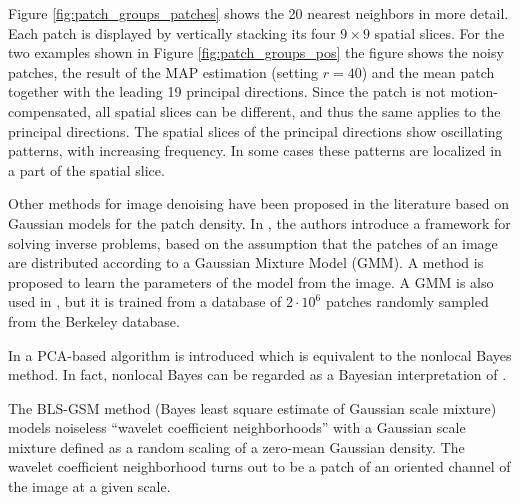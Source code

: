 \documentclass[10pt, journal, twocolumn, final, a4paper]{IEEEtran}
\begin{document}
Figure \ref{fig:patch_groups_patches} shows the 20 nearest neighbors in 
more detail. Each patch is displayed by vertically stacking its four $9\times
9$ spatial slices. For the two examples shown in Figure \ref{fig:patch_groups_pos}
the figure shows the noisy patches, the result of the MAP estimation (setting
$r = 40$) and the mean patch together with the leading 19 principal directions.
Since the patch is not motion-compensated, all spatial slices can be different,
and thus the same applies to the principal directions.
The spatial slices of the principal directions show oscillating patterns, with
increasing frequency. In some cases these patterns are localized in a part of
the spatial slice.



\bigskip

Other methods for image denoising have been proposed in the
literature based on Gaussian models for the patch density. In \cite{Yu2012},
the authors introduce a framework for solving inverse problems, based on the
assumption that the patches of an image are distributed according to a Gaussian
Mixture Model (GMM). A method is proposed to learn the parameters of the model from
the image. A GMM is also used in \cite{Zoran2011}, but it is trained from a
database of $2\cdot 10^6$ patches randomly sampled from the Berkeley database.

In \cite{Zhang2010} a PCA-based algorithm is introduced which is equivalent to 
the nonlocal Bayes method. In fact, nonlocal Bayes can be regarded as a Bayesian 
interpretation of \cite{Zhang2010}.

The BLS-GSM method \cite{Portilla2003} (Bayes least square estimate of Gaussian
scale mixture) models noiseless ``wavelet coefficient neighborhoods'' with a
Gaussian scale mixture defined as a random scaling of a zero-mean Gaussian
density. The wavelet coefficient neighborhood turns out to be a patch of an
oriented channel of the image at a given scale.
\end{document}
